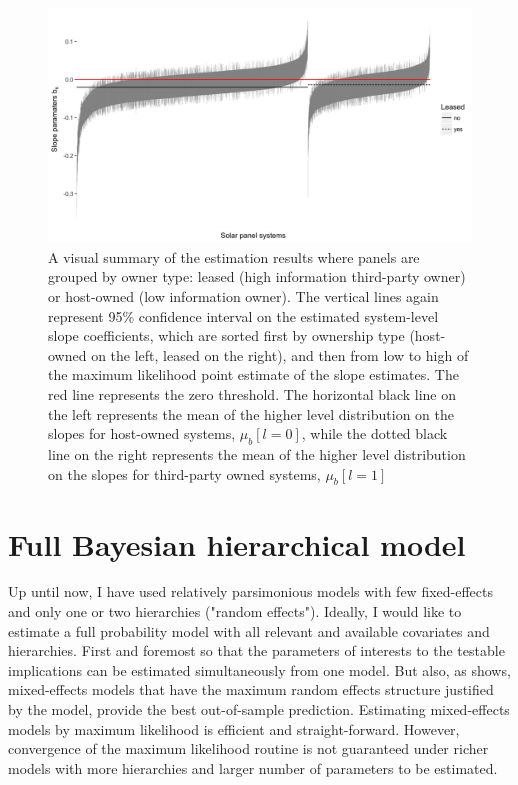\documentclass[a4paper]{article}
\begin{document}
\begin{figure}
  \centering
	\includegraphics[width=1\textwidth]{figures/lease_sys_fig.png}
	\caption{A visual summary of the estimation results where panels are grouped by owner type: leased (high information third-party owner) or host-owned (low information owner). The vertical lines again represent 95\% confidence interval on the estimated system-level slope coefficients, which are sorted first by ownership type (host-owned on the left, leased on the right), and then from low to high of the maximum likelihood point estimate of the slope estimates. The red line represents the zero threshold. The horizontal black line on the left represents the mean of the higher level distribution on the slopes for host-owned systems, $\mu_b[l=0]$, while the dotted black line on the right represents the mean of the higher level distribution on the slopes for third-party owned systems, $\mu_b[l=1]$ }
	\label{lease_sys_fig}
\end{figure}

\section{Full Bayesian hierarchical model}
Up until now, I have used relatively parsimonious models with few fixed-effects and only one or two hierarchies ("random effects").  Ideally, I would like to estimate a full probability model with all relevant and available covariates and hierarchies. First and foremost so that the parameters of interests to the testable implications can be estimated simultaneously from one model. But also, as \citet{barr_random_2013} shows, mixed-effects models that have the maximum random effects structure justified by the model, provide the best out-of-sample prediction. Estimating mixed-effects models by maximum likelihood is efficient and straight-forward. However, convergence of the maximum likelihood routine is not guaranteed under richer models with more hierarchies and larger number of parameters to be estimated.
\end{document}
